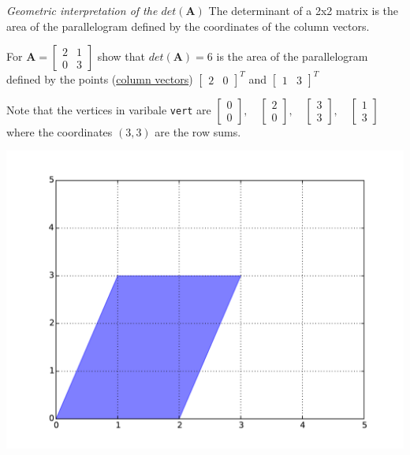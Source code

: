 \emph{Geometric interpretation of the $det(\mathbf{A})$} The determinant of a 2x2 matrix
is the area of the parallelogram defined by the coordinates of the column vectors.

For $\mathbf{A} = \left[\begin{matrix}2 & 1\\0 & 3\end{matrix}\right]$ show that
$det(\mathbf{A}) = 6$ is the area of the parallelogram defined by the points (\underline{column
vectors})  $\left[\begin{matrix}2 & 0\end{matrix}\right]^T$ and
$\left[\begin{matrix}1 & 3\end{matrix}\right]^T$

Note that the vertices in varibale \texttt{vert} are $
\left[\begin{matrix}0\\0\end{matrix}\right], \quad
\left[\begin{matrix}2\\0\end{matrix}\right], \quad
\left[\begin{matrix}3\\3\end{matrix}\right], \quad
\left[\begin{matrix}1\\3\end{matrix}\right]
$ where the coordinates $(3,3)$ are the row sums.

\includegraphics[width=\linewidth]{figs/ex6_1_4.pdf}

